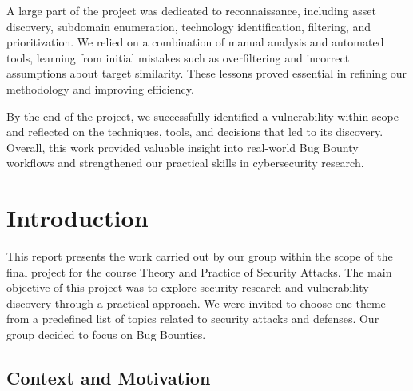 \documentclass[12pt,a4paper]{report}
\begin{document}
A large part of the project was dedicated to reconnaissance, including asset discovery, subdomain enumeration, technology identification, filtering, and prioritization. We relied on a combination of manual analysis and automated tools, learning from initial mistakes such as overfiltering and incorrect assumptions about target similarity. These lessons proved essential in refining our methodology and improving efficiency.

By the end of the project, we successfully identified a vulnerability within scope and reflected on the techniques, tools, and decisions that led to its discovery. Overall, this work provided valuable insight into real-world Bug Bounty workflows and strengthened our practical skills in cybersecurity research.


\acresetall %


\renewcommand{\contentsname}{Table of Contents}

\tableofcontents


\chapter{Introduction}

\pagestyle{fancy}
\setcounter{page}{1}

This report presents the work carried out by our group within the scope of the final project for the course Theory and Practice of Security Attacks. The main objective of this project was to explore security research and vulnerability discovery through a practical approach. We were invited to choose one theme from a predefined list of topics related to security attacks and defenses. Our group decided to focus on Bug Bounties.

\section{Context and Motivation}
\end{document}
